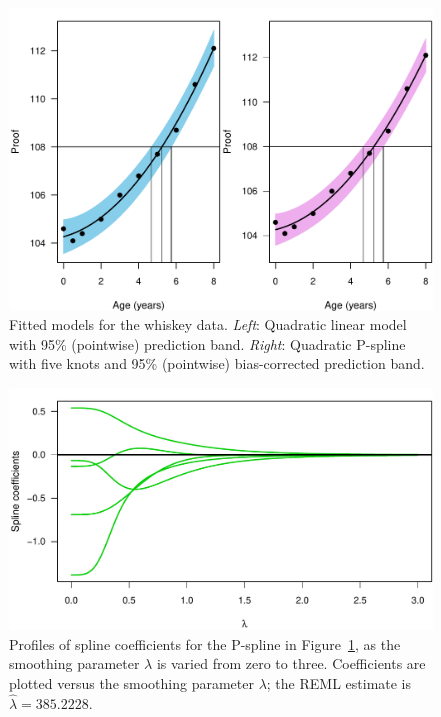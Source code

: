 \documentclass[cmfont,usenames,dvipsnames,leqno]{afit-etd}\usepackage[]{graphicx}\usepackage[]{color}
\makeatletter
\def\maxwidth{ %
  \ifdim\Gin@nat@width>\linewidth
    \linewidth
  \else
    \Gin@nat@width
  \fi
}
\newenvironment{knitrout}{}{} %
\renewenvironment{knitrout}{\begin{singlespace}}{\end{singlespace}}
\newcommand{\wh}[1]{\ensuremath{\widehat{#1}}}
\makeatother
\begin{document}
\begin{knitrout}
\color{fgcolor}\begin{figure}[H]

\includegraphics[width=\maxwidth]{figure/whiskey-calibration} \caption[Fitted  models for the whiskey data]{Fitted  models for the whiskey data. \textit{Left}: Quadratic linear model with 95\% (pointwise) prediction band. \textit{Right}: Quadratic \ac{P-spline} with five knots and 95\% (pointwise) bias-corrected prediction band.\label{fig:whiskey-calibration}}
\end{figure}


\end{knitrout}


\begin{knitrout}
\color{fgcolor}\begin{figure}[H]

\includegraphics[width=\maxwidth]{figure/whiskey-paths} \caption[Spline coefficient paths for the whiskey example]{Profiles of spline coefficients for the \ac{P-spline} in Figure~\ref{fig:whiskey-calibration}, as the smoothing parameter $\lambda$ is varied from zero to three. Coefficients are plotted versus the smoothing parameter $\lambda$; the \ac{REML} estimate is $\wh{\lambda} = 385.2228$.\label{fig:whiskey-paths}}
\end{figure}


\end{knitrout}
\end{document}
